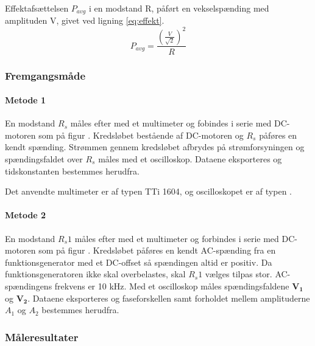 Effektafsættelsen $P_{avg}$ i en modstand R, påført en vekselspænding med amplituden V, givet ved ligning \ref{eq:effekt}.
\begin{equation}
	P_{avg}=\frac{\left(\frac{V}{\sqrt{2}}\right)^2}{R}
	\label{eq:effekt}
 \end{equation}
\subsubsection{Fremgangsmåde}
\paragraph{Metode 1}
En modstand $R_s$ måles efter med et multimeter og fobindes i serie med DC-motoren
som på figur %
.
Kredsløbet bestående af DC-motoren og $R_s$ påføres en kendt spænding.
Strømmen gennem kredsløbet afbrydes på strømforsyningen og spændingsfaldet
over $R_s$ måles med et oscilloskop.
Dataene eksporteres og tidskonstanten bestemmes herudfra.

Det anvendte multimeter er af typen TTi 1604,
og oscilloskopet er af typen .

\paragraph{Metode 2}
En modstand $R_s1$ måles efter med et multimeter og forbindes i serie med DC-motoren
som på figur %
.
Kredsløbet påføres en kendt AC-spænding fra en funktionsgenerator med et DC-offset så spændingen
altid er positiv.
Da funktionsgeneratoren ikke skal overbelastes, skal $R_s1$ vælges tilpas stor.
AC-spændingens frekvens er 10 kHz.
Med et oscilloskop måles spændingsfaldene $\mathbf{V_1}$ og $\mathbf{V_2}$.
Dataene eksporteres og faseforskellen samt forholdet mellem amplituderne $A_1$ og $A_2$ bestemmes herudfra.
\subsubsection{Måleresultater}
